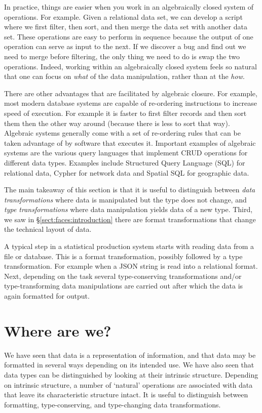 In practice, things are easier when you work in an algebraically closed system
of operations. For example. Given a relational data set, we can develop a
script where we first filter, then sort, and then merge the data set with
another data set. These operations are easy to perform in sequence because the
output of one operation can serve as input to the next. If we discover a bug
and find out we need to merge before filtering, the only thing we need to do is
swap the two operations. Indeed, working within an algebraically closed system
feels so natural that one can focus on \emph{what} of the data manipulation,
rather than at the \emph{how}.

There are other advantages that are facilitated by algebraic closure. For
example, most modern database systems are capable of re-ordering instructions
to increase speed of execution. For example it is faster to first filter
records and then sort them then the other way around (because there is less to
sort that way). Algebraic systems generally come with a set of re-ordering
rules that can be taken advantage of by software that executes it. Important
examples of algebraic systems are the various query languages that implement
CRUD operations for different data types. Examples include Structured Query
Language (SQL) for relational data, Cypher for network data and Spatial SQL for
geographic data.


The main takeaway of this section is that it is useful to distinguish between
\emph{data transformations} where data is manipulated but the type does not
change, and \emph{type transformations} where data manipulation yields data of
a new type. Third, we saw in \S\ref{sect:faces:introduction} there are format
transformations that change the technical layout of data. 

A typical step in a statistical production system starts with reading data from
a file or database. This is a format transformation, possibly followed by a
type transformation. For example when a JSON string is read into a relational
format. Next, depending on the task several type-conserving transformations
and/or type-transforming data manipulations are carried out after which the
data is again formatted for output.


\section*{Where are we?}
We have seen that data is a representation of information, and that data may be
formatted in several ways depending on its intended use. We have also seen that
data types can be distinguished by looking at their intrinsic structure.
Depending on intrinsic structure, a number of `natural' operations are
associated with data that leave its characteristic structure intact. It is
useful to distinguish between formatting, type-conserving, and type-changing
data transformations.



